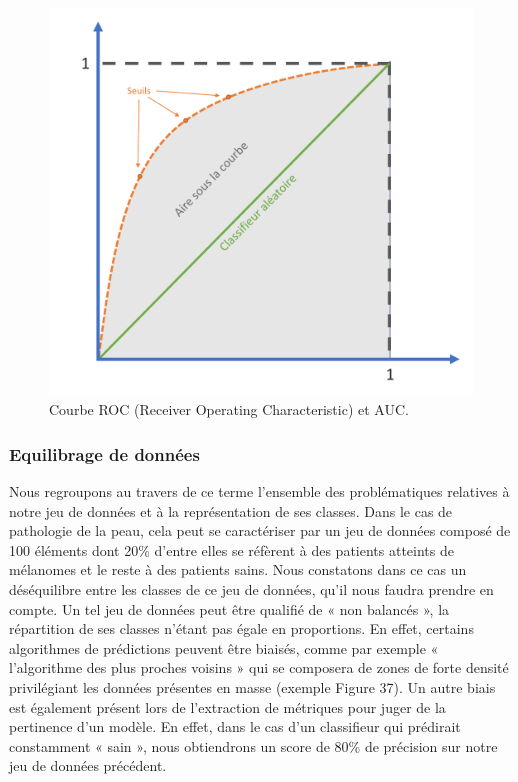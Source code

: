 \begin{figure}[H]
    \centering
    \includegraphics[width=\linewidth]{contents/chapter_3/resources/RocCurve.pdf}
    \caption{Courbe ROC (Receiver Operating Characteristic) et AUC.}
    \label{fig:chapter_3:roc}
\end{figure}

\subsubsection{Equilibrage de données}
Nous regroupons au travers de ce terme l’ensemble des problématiques relatives à notre jeu de données et à la représentation de ses classes. Dans le cas de pathologie de la peau, cela peut se caractériser par un jeu de données composé de 100 éléments dont 20\% d’entre elles se réfèrent à des patients atteints de mélanomes et le reste à des patients sains. Nous constatons dans ce cas un déséquilibre entre les classes de ce jeu de données, qu’il nous faudra prendre en compte. Un tel jeu de données peut être qualifié de « non balancés », la répartition de ses classes n’étant pas égale en proportions.
En effet, certains algorithmes de prédictions peuvent être biaisés, comme par exemple « l’algorithme des plus proches voisins » qui se composera de zones de forte densité privilégiant les données présentes en masse (exemple Figure 37). Un autre biais est également présent lors de l’extraction de métriques pour juger de la pertinence d’un modèle. En effet, dans le cas d’un classifieur qui prédirait constamment « sain », nous obtiendrons un score de 80\% de précision sur notre jeu de données précédent.
  
